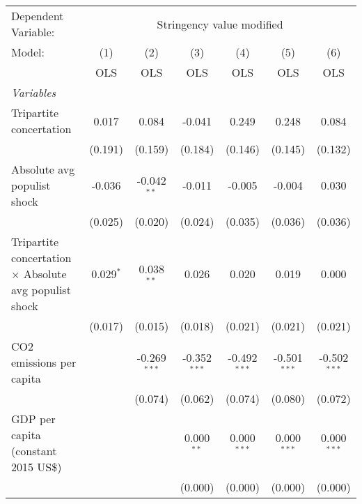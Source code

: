 
\begingroup
\centering
\begin{tabular}{lcccccc}
   \toprule
   Dependent Variable: & \multicolumn{6}{c}{Stringency value modified}\\
   Model:                                                        & (1)         & (2)            & (3)            & (4)            & (5)            & (6)\\  
                                                                 &  OLS        & OLS            & OLS            & OLS            & OLS            & OLS\\  
   \midrule
   \emph{Variables}\\
   Tripartite concertation                                       & 0.017       & 0.084          & -0.041         & 0.249          & 0.248          & 0.084\\   
                                                                 & (0.191)     & (0.159)        & (0.184)        & (0.146)        & (0.145)        & (0.132)\\   
   Absolute avg populist shock                                   & -0.036      & -0.042$^{**}$  & -0.011         & -0.005         & -0.004         & 0.030\\   
                                                                 & (0.025)     & (0.020)        & (0.024)        & (0.035)        & (0.036)        & (0.036)\\   
   Tripartite concertation $\times$ Absolute avg populist shock  & 0.029$^{*}$ & 0.038$^{**}$   & 0.026          & 0.020          & 0.019          & 0.000\\   
                                                                 & (0.017)     & (0.015)        & (0.018)        & (0.021)        & (0.021)        & (0.021)\\   
   CO2 emissions per capita                                      &             & -0.269$^{***}$ & -0.352$^{***}$ & -0.492$^{***}$ & -0.501$^{***}$ & -0.502$^{***}$\\   
                                                                 &             & (0.074)        & (0.062)        & (0.074)        & (0.080)        & (0.072)\\   
   GDP per capita (constant 2015 US\$)                           &             &                & 0.000$^{**}$   & 0.000$^{***}$  & 0.000$^{***}$  & 0.000$^{***}$\\   
                                                                 &             &                & (0.000)        & (0.000)        & (0.000)        & (0.000)\\   

\end{tabular}
